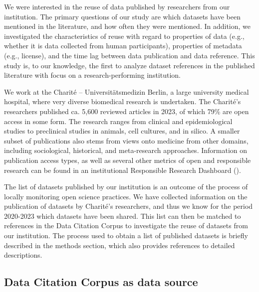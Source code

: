 \documentclass[
  letterpaper,
  DIV=11,
  numbers=noendperiod]{scrartcl}
\begin{document}
We were interested in the reuse of data published by researchers from
our institution. The primary questions of our study are which datasets
have been mentioned in the literature, and how often they were
mentioned. In addition, we investigated the characteristics of reuse
with regard to properties of data (e.g., whether it is data collected
from human participants), properties of metadata (e.g., license), and
the time lag between data publication and data reference. This study is,
to our knowledge, the first to analyze dataset references in the
published literature with focus on a research-performing institution.

We work at the Charité -- Universitätsmedizin Berlin, a large university
medical hospital, where very diverse biomedical research is undertaken.
The Charité's researchers published ca. 5,600 reviewed articles in 2023,
of which 79\% are open access in some form. The research ranges from
clinical and epidemiological studies to preclinical studies in animals,
cell cultures, and in silico. A smaller subset of publications also
stems from views onto medicine from other domains, including
sociological, historical, and meta-research approaches. Information on
publication access types, as well as several other metrics of open and
responsible research can be found in an institutional Responsible
Research Dashboard ().

The list of datasets published by our institution is an outcome of the
process of locally monitoring open science practices. We have collected
information on the publication of datasets by Charité's researchers, and
thus we know for the period 2020-2023 which datasets have been shared.
This list can then be matched to references in the Data Citation Corpus
to investigate the reuse of datasets from our institution. The process
used to obtain a list of published datasets is briefly described in the
methods section, which also provides references to detailed
descriptions.

\subsection{Data Citation Corpus as data source}\label{sec-intro-dcc}
\end{document}
